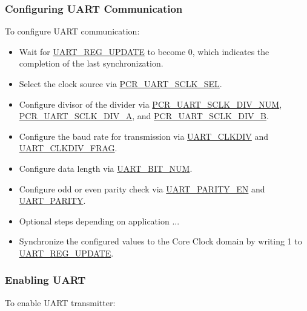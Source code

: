 \documentclass[main\_\_EN.tex]{subfiles}
\begin{document}
\subsubsection{Configuring UART Communication}

To configure UART communication:


\begin{itemize}
    \item Wait for \hyperref[fielddesc:UARTREGUPDATE]{UART\_REG\_UPDATE} to become 0, which indicates the completion of the last synchronization.
    \item Select the clock source via \hyperref[fielddesc:PCRUART0SCLKSEL]{PCR\_UART\_SCLK\_SEL}.
    \item Configure divisor of the divider via \hyperref[fielddesc:PCRUART0SCLKDIVNUM]{PCR\_UART\_SCLK\_DIV\_NUM}, \hyperref[fielddesc:PCRUART0SCLKDIVA]{PCR\_UART\_SCLK\_DIV\_A}, and \hyperref[fielddesc:PCRUART0SCLKDIVB]{PCR\_UART\_SCLK\_DIV\_B}.
    \item Configure the baud rate for transmission via \hyperref[fielddesc:UARTCLKDIV]{UART\_CLKDIV} and \hyperref[fielddesc:UARTCLKDIVFRAG]{UART\_CLKDIV\_FRAG}.
    \item Configure data length via \hyperref[fielddesc:UARTBITNUM]{UART\_BIT\_NUM}.
    \item Configure odd or even parity check via \hyperref[fielddesc:UARTPARITYEN]{UART\_PARITY\_EN} and \hyperref[fielddesc:UARTPARITY]{UART\_PARITY}.
    \item Optional steps depending on application ...
    \item Synchronize the configured values to the Core Clock domain by writing 1 to \hyperref[fielddesc:UARTREGUPDATE]{UART\_REG\_UPDATE}.
\end{itemize}

\subsubsection{Enabling UART}

To enable UART transmitter:
\end{document}
